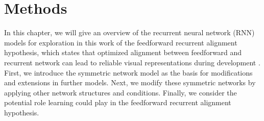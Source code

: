 \documentclass[11pt]{article}
\begin{document}
	
	\section{Methods}
	In this chapter, we will give an overview of the recurrent neural network (RNN) models for exploration in this work of the feedforward recurrent alignment hypothesis, which states that optimized alignment between feedforward and recurrent network can lead to reliable visual representations during development \cite{tragenap2023nature}. First, we introduce the symmetric network model as the basis for modifications and extensions in further models. Next, we modify these symmetric networks by applying other network structures and conditions. Finally, we consider the potential role learning could play in the feedforward recurrent alignment hypothesis. 
	
\end{document}
